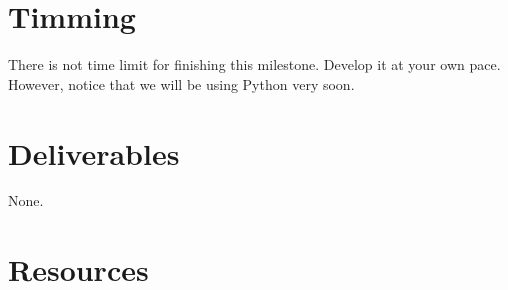 \section{Timming}

There is not time limit for finishing this milestone. Develop it at
your own pace. However, notice that we will be using Python very soon.

\section{Deliverables}

None.

\section{Resources}



